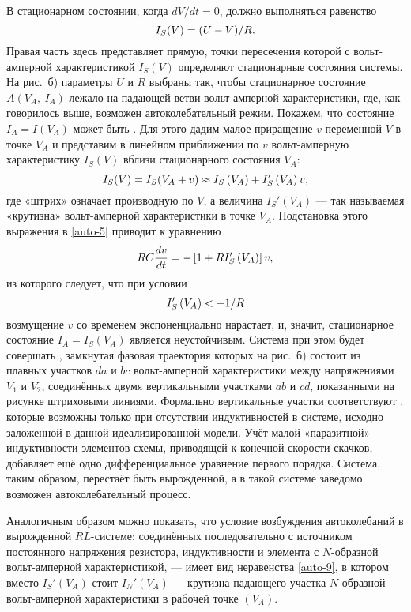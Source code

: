 В стационарном состоянии, когда $dV / dt = 0$, должно выполняться равенство
\begin{equation}
	\eqmark{auto-6}
	I_S(V)=(U-V)/R.
\end{equation}
Правая часть здесь представляет  прямую, точки
пересечения которой с вольт-амперной характеристикой ${{I}_{S}}\left( V \right)$
определяют стационарные состояния системы. На рис.~б) параметры $U$
и $R$ выбраны так, чтобы стационарное состояние $A(V_A,~I_A)$ лежало на падающей
ветви вольт-амперной характеристики, где, как говорилось выше, возможен
автоколебательный режим. Покажем, что состояние $I_A=I(V_A)$ может быть
. Для этого дадим малое приращение $v$ переменной $V$ в
точке
$V_A$ и представим в линейном приближении по $v$ вольт-амперную характеристику
$I_S(V)$ вблизи стационарного состояния $V_A$:
\begin{equation}
	\eqmark{auto-7}
	I_S(V)=I_S(V_A + v)\approx I_S\left( V_A \right)+{I}_S'\left( V_A \right)v,
\end{equation}
где «штрих» означает производную по $V$, а величина ${I}_S'\left( V_A \right)$ --- так называемая «крутизна» вольт-амперной характеристики в точке $V_A$. Подстановка этого выражения в
\eqref{auto-5} приводит к уравнению
\begin{equation}
	\eqmark{auto-8}
	RC\frac{dv}{dt}=-\left[ 1+R{I}_S'\left( V_A \right) \right]v,
\end{equation}
из которого следует, что при условии
\begin{equation}
	\eqmark{auto-9}
	I_S'\left( V_A \right) <- {1}/{R}
\end{equation}
возмущение $v$ со временем экспоненциально нарастает, и, значит, стационарное
состояние $I_A=I_S(V_A)$ является неустойчивым. Система при этом будет совершать
, замкнутая фазовая траектория которых
на рис.~б) состоит из плавных участков $da$ и $bc$ вольт-амперной
характеристики между напряжениями $V_1$ и $V_2$, соединённых двумя вертикальными
участками $ab$ и $cd$, показанными на рисунке штриховыми линиями. Формально
вертикальные участки соответствуют , которые возможны
только при отсутствии индуктивностей в системе, исходно заложенной в данной
идеализированной модели. Учёт малой «паразитной» индуктивности элементов схемы, приводящей к конечной скорости скачков, добавляет ещё одно дифференциальное уравнение первого порядка. Система, таким образом, перестаёт быть вырожденной, а в такой системе заведомо возможен автоколебательный процесс.

Аналогичным образом можно показать, что условие возбуждения автоколебаний в вырожденной $RL$-системе: соединённых последовательно с источником постоянного напряжения резистора, индуктивности и элемента с $N$-образной вольт-амперной характеристикой, --- имеет вид неравенства \eqref{auto-9}, в котором вместо $I_S'\left(V_A\right)$ стоит $I_N'\left(V_A\right)$ --- крутизна падающего  участка $N$-образной вольт-амперной характеристики в рабочей точке $\left(V_A\right)$.
